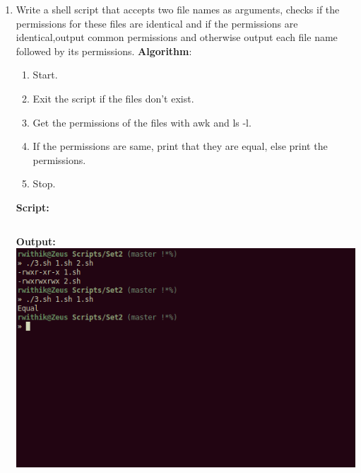 \documentclass[10pt,a4paper,titlepage]{report}
\begin{document}
\begin{enumerate}
\item Write a shell script that accepts two file names as arguments, checks if the permissions for these files are identical and if the permissions are identical,output common permissions and otherwise output each file name followed by its permissions. \newline
\textbf{Algorithm}:\newline
\begin{enumerate}
	\item Start.
	\item Exit the script if the files don't exist.
	\item Get the permissions of the files with {\color{red}awk} and {\color{red}ls -l}.
	\item If the permissions are same, print that they are equal, else print the permissions.
	\item Stop.
\end{enumerate}
\newline
\textbf{Script:}\newline
\inputminted{bash}{../Scripts/Set2/3.sh}
\newline
\textbf{Output:}\newline
\includegraphics[width=\linewidth]{../Images/Shell2/3.png}
\pagebreak


\end{enumerate}
\end{document}
